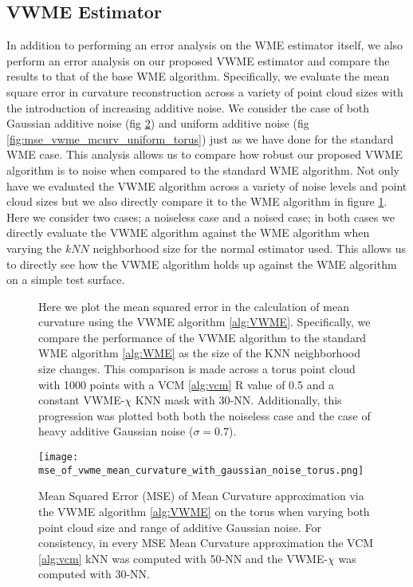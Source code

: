 \documentclass{article}
\begin{document}
\subsection{VWME Estimator}
In addition to performing an error analysis on the WME estimator itself, we also perform an error analysis on our proposed VWME estimator and compare the results to that of the base WME algorithm. Specifically, we evaluate the mean square error in curvature reconstruction across a variety of point cloud sizes with the introduction of increasing additive noise. We consider the case of both Gaussian additive noise (fig \ref{fig:mse_vwme_mcurv_gaussian_torus}) and uniform additive noise (fig \ref{fig:mse_vwme_mcurv_uniform_torus}) just as we have done for the standard WME case. This analysis allows us to compare how robust our proposed VWME algorithm is to noise when compared to the standard WME algorithm.
Not only have we evaluated the VWME algorithm across a variety of noise levels and point cloud sizes but we also directly compare it to the WME algorithm in figure \ref{fig:mse_of_vwme_mean_curvature_varying_k_noise}. Here we consider two cases; a noiseless case and a noised case; in both cases we directly evaluate the VWME algorithm against the WME algorithm when varying the $kNN$ neighborhood size for the normal estimator used. This allows us to directly see how the VWME algorithm holds up against the WME algorithm on a simple test surface.  
\begin{figure}
    \centering
    \qquad
    \caption{ Here we plot the mean squared error in the calculation of mean curvature using the VWME algorithm \eqref{alg:VWME}. Specifically, we compare the performance of the VWME algorithm to the standard WME algorithm \eqref{alg:WME} as the size of the KNN neighborhood size changes. This comparison is made across a torus point cloud with 1000 points with a VCM \eqref{alg:vcm} R value of 0.5 and a constant VWME-$\chi$ KNN mask with 30-NN. Additionally, this progression was plotted both both the noiseless case and the case of heavy additive Gaussian noise ($\sigma = 0.7$). }%
    \label{fig:mse_of_vwme_mean_curvature_varying_k_noise}
\end{figure}

\begin{figure}
    \centering
    \texttt{[image: mse\_of\_vwme\_mean\_curvature\_with\_gaussian\_noise\_torus.png]}
    \caption{Mean Squared Error (MSE) of Mean Curvature approximation via the VWME algorithm \eqref{alg:VWME} on the torus when varying both point cloud size and range of additive Gaussian noise. For consistency, in every MSE Mean Curvature approximation the VCM \eqref{alg:vcm} kNN was computed with 50-NN and the VWME-$\chi$ was computed with 30-NN.}
    \label{fig:mse_vwme_mcurv_gaussian_torus}
\end{figure}
\end{document}

